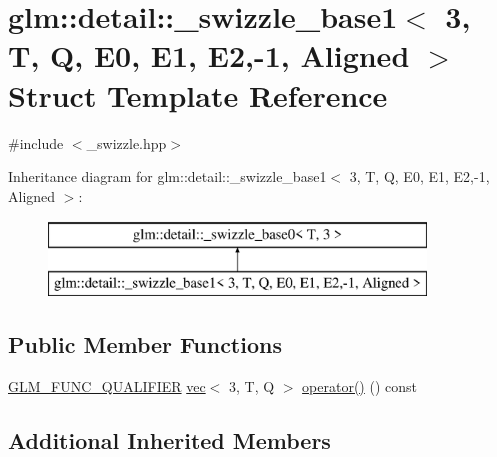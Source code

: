 \hypertarget{structglm_1_1detail_1_1__swizzle__base1_3_013_00_01_t_00_01_q_00_01_e0_00_01_e1_00_01_e2_00-1_00_01_aligned_01_4}{}\section{glm\+:\+:detail\+:\+:\+\_\+swizzle\+\_\+base1$<$ 3, T, Q, E0, E1, E2,-\/1, Aligned $>$ Struct Template Reference}
\label{structglm_1_1detail_1_1__swizzle__base1_3_013_00_01_t_00_01_q_00_01_e0_00_01_e1_00_01_e2_00-1_00_01_aligned_01_4}


{\ttfamily \#include $<$\+\_\+swizzle.\+hpp$>$}

Inheritance diagram for glm\+:\+:detail\+:\+:\+\_\+swizzle\+\_\+base1$<$ 3, T, Q, E0, E1, E2,-\/1, Aligned $>$\+:\begin{figure}[H]
\begin{center}
\leavevmode
\includegraphics[height=2.000000cm]{structglm_1_1detail_1_1__swizzle__base1_3_013_00_01_t_00_01_q_00_01_e0_00_01_e1_00_01_e2_00-1_00_01_aligned_01_4}
\end{center}
\end{figure}
\subsection*{Public Member Functions}
\begin{DoxyCompactItemize}
\item 
\hyperlink{setup_8hpp_a33fdea6f91c5f834105f7415e2a64407}{G\+L\+M\+\_\+\+F\+U\+N\+C\+\_\+\+Q\+U\+A\+L\+I\+F\+I\+ER} \hyperlink{structglm_1_1vec}{vec}$<$ 3, T, Q $>$ \hyperlink{structglm_1_1detail_1_1__swizzle__base1_3_013_00_01_t_00_01_q_00_01_e0_00_01_e1_00_01_e2_00-1_00_01_aligned_01_4_a52562036288d3f7a063c5172f4b572ab}{operator()} () const
\end{DoxyCompactItemize}
\subsection*{Additional Inherited Members}


